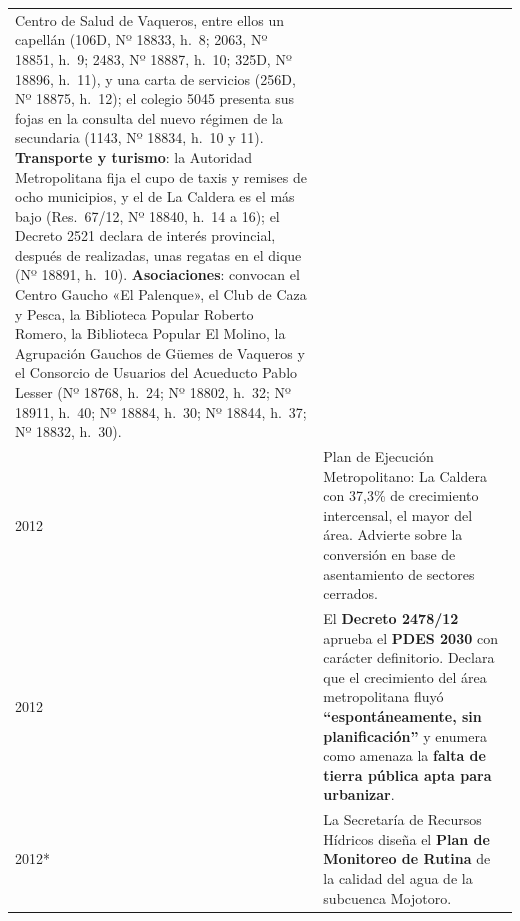 \begin{longtable}{@{}p{2.7cm}p{10.3cm}@{}}
Centro de Salud de Vaqueros, entre ellos un capellán (106D, Nº 18833, h.\ 8; 2063, Nº 18851, h.\ 9; 2483, Nº 18887, h.\ 10; 325D, Nº 18896, h.\ 11), y una carta de servicios (256D, Nº 18875, h.\ 12); el colegio 5045 presenta sus fojas en la consulta del nuevo régimen de la secundaria (1143, Nº 18834, h.\ 10 y 11). \textbf{Transporte y turismo}: la Autoridad Metropolitana fija el cupo de taxis y remises de ocho municipios, y el de La Caldera es el más bajo (Res.\ 67/12, Nº 18840, h.\ 14 a 16); el Decreto 2521 declara de interés provincial, después de realizadas, unas regatas en el dique (Nº 18891, h.\ 10). \textbf{Asociaciones}: convocan el Centro Gaucho «El Palenque», el Club de Caza y Pesca, la Biblioteca Popular Roberto Romero, la Biblioteca Popular El Molino, la Agrupación Gauchos de Güemes de Vaqueros y el Consorcio de Usuarios del Acueducto Pablo Lesser (Nº 18768, h.\ 24; Nº 18802, h.\ 32; Nº 18911, h.\ 40; Nº 18884, h.\ 30; Nº 18844, h.\ 37; Nº 18832, h.\ 30). \\
2012 & Plan de Ejecución Metropolitano: La Caldera con 37,3\% de crecimiento intercensal, el mayor del área. Advierte sobre la conversión en base de asentamiento de sectores cerrados. \\
2012 & El \textbf{Decreto 2478/12} aprueba el \textbf{PDES 2030} con carácter definitorio. Declara que el crecimiento del área metropolitana fluyó \textbf{``espontáneamente, sin planificación''} y enumera como amenaza la \textbf{falta de tierra pública apta para urbanizar}. \\
2012* & La Secretaría de Recursos Hídricos diseña el \textbf{Plan de Monitoreo de Rutina} de la calidad del agua de la subcuenca Mojotoro. \\

\end{longtable}
